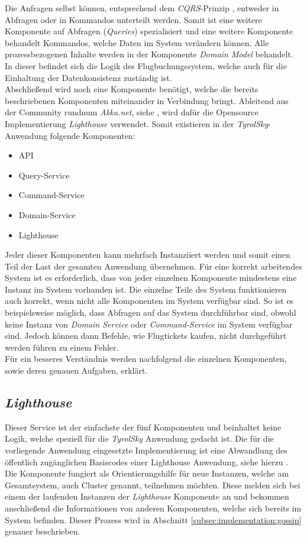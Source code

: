 Die Anfragen selbst können, entsprechend dem \textit{CQRS}-Prinzip \cite{cqrsYoung2010}, entweder in Abfragen oder in Kommandos unterteilt werden. Somit ist eine weitere Komponente auf Abfragen (\textit{Queries}) spezialisiert und eine weitere Komponente behandelt Kommandos, welche Daten im System verändern können. Alle prozessbezogenen Inhalte werden in der Komponente \textit{Domain Model} behandelt. In dieser befindet sich die Logik des Flugbuchungssystem, welche auch für die Einhaltung der Datenkonsistenz zuständig ist. \\
Abschließend wird noch eine Komponente benötigt, welche die bereits beschriebenen Komponenten miteinander in Verbindung bringt. 
Ableitend aus der Community rundnum \textit{Akka.net}, siehe \cite{lighthouse}, wird dafür die Opensource Implementierung \textit{Lighthouse} verwendet. Somit existieren in der \textit{TyrolSky}-Anwendung folgende Komponenten:
\begin{itemize}
  \item API
  \item Query-Service
  \item Command-Service
  \item Domain-Service
  \item Lighthouse
\end{itemize}
Jeder dieser Komponenten kann mehrfach Instanziiert werden und somit einen Teil der Last der gesamten Anwendung übernehmen. Für eine korrekt arbeitendes System ist es erforderlich, dass von jeder einzelnen Komponente mindestens eine Instanz im System vorhanden ist. Die einzelne Teile des System funktionieren auch korrekt, wenn nicht alle Komponenten im System verfügbar sind. So ist es beispielsweise möglich, dass Abfragen auf das System durchführbar sind, obwohl keine Instanz von \textit{Domain Service} oder \textit{Command-Service} im System verfügbar sind. Jedoch können dann Befehle, wie Flugtickets kaufen, nicht durchgeführt werden führen zu einem Fehler.\\
Für ein besseres Verständnis werden nachfolgend die einzelnen Komponenten, sowie deren genauen Aufgaben, erklärt.

\subsection{\textit{Lighthouse}}
\label{subsec:implementation:lighthouse}
Dieser Service ist der einfachste der fünf Komponenten und beinhaltet keine Logik, welche speziell für die \textit{TyrolSky} Anwendung gedacht ist. Die für die vorliegende Anwendung eingesetzte Implementierung ist eine Abwandlung des öffentlich zugänglichen Basiscodes einer Lighthouse Anwendung, siehe hierzu \cite{lighthouse}. \\
Die Komponente fungiert als Orientierungshilfe für neue Instanzen, welche am Gesamtsystem, auch Cluster genannt, teilnehmen möchten. Diese melden sich bei einem der laufenden Instanzen der \textit{Lighthouse} Komponente an und bekommen anschließend die Informationen von anderen Komponenten, welche sich bereits im System befinden. Dieser Prozess wird in Abschnitt \ref{subsec:implementation:gossip} genauer beschrieben.


